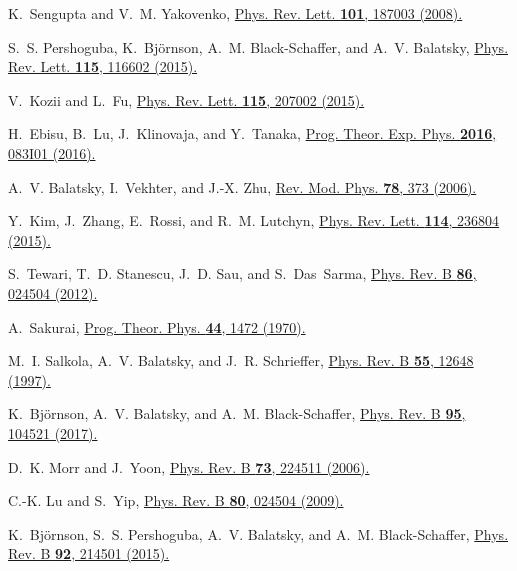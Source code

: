 \documentclass[aps,prl,reprint,nobibnotes]{revtex4-1}
\begin{document}
\begin{thebibliography}{10}
K.~Sengupta and V.~M. Yakovenko,
\newblock \href{https://doi.org/10.1103/PhysRevLett.101.187003}{Phys. Rev. Lett. {\bf 101}, 187003 (2008).}

S.~S. Pershoguba, K.~Bj\"ornson, A.~M. Black-Schaffer, and A.~V. Balatsky,
\newblock \href{https://doi.org/10.1103/PhysRevLett.115.116602}{Phys. Rev. Lett. {\bf 115}, 116602 (2015).}

V.~Kozii and L.~Fu,
\newblock \href{https://doi.org/10.1103/PhysRevLett.115.207002}{Phys. Rev. Lett. {\bf 115}, 207002 (2015).}

H.~Ebisu, B.~Lu, J.~Klinovaja, and Y.~Tanaka,
\newblock \href{https://doi.org/10.1093/ptep/ptw094}{Prog. Theor. Exp. Phys. {\bf 2016}, 083I01 (2016).}

A.~V. Balatsky, I.~Vekhter, and J.-X. Zhu,
\newblock \href{https://doi.org/10.1103/RevModPhys.78.373}{Rev. Mod. Phys. {\bf 78}, 373 (2006).}

Y.~Kim, J.~Zhang, E.~Rossi, and R.~M. Lutchyn,
\newblock \href{https://doi.org/10.1103/PhysRevLett.114.236804}{Phys. Rev. Lett. {\bf 114}, 236804 (2015).}

S.~Tewari, T.~D. Stanescu, J.~D. Sau, and S.~Das~Sarma,
\newblock \href{https://doi.org/10.1103/PhysRevB.86.024504}{Phys. Rev. B {\bf 86}, 024504 (2012).}

A.~Sakurai,
\newblock \href{https://doi.org/10.1143/PTP.44.1472}{Prog. Theor. Phys. {\bf 44}, 1472 (1970).}

M.~I. Salkola, A.~V. Balatsky, and J.~R. Schrieffer,
\newblock \href{https://doi.org/10.1103/PhysRevB.55.12648}{Phys. Rev. B {\bf 55}, 12648 (1997).}

K.~Bj\"ornson, A.~V. Balatsky, and A.~M. Black-Schaffer,
\newblock \href{https://doi.org/10.1103/PhysRevB.95.104521}{Phys. Rev. B {\bf 95}, 104521 (2017).}

D.~K. Morr and J.~Yoon,
\newblock \href{https://doi.org/10.1103/PhysRevB.73.224511}{Phys. Rev. B {\bf 73}, 224511 (2006).}

C.-K. Lu and S.~Yip,
\newblock \href{https://doi.org/10.1103/PhysRevB.80.024504}{Phys. Rev. B {\bf 80}, 024504 (2009).}

K.~Bj\"ornson, S.~S. Pershoguba, A.~V. Balatsky, and A.~M. Black-Schaffer,
\newblock \href{https://doi.org/10.1103/PhysRevB.92.214501}{Phys. Rev. B {\bf 92}, 214501 (2015).}


\end{thebibliography}
\end{document}
